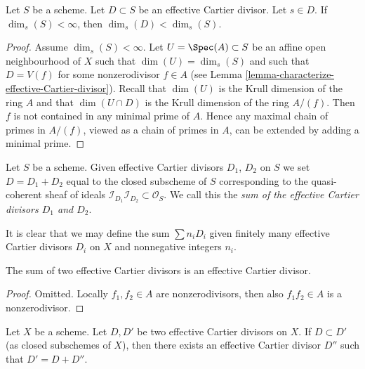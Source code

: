 \begin{lemma}
\label{lemma-effective-Cartier-makes-dimension-drop}
Let $S$ be a scheme.
Let $D \subset S$ be an effective Cartier divisor.
Let $s \in D$.
If $\dim_s(S) < \infty$, then $\dim_s(D) < \dim_s(S)$.
\end{lemma}

\begin{proof}
Assume $\dim_s(S) < \infty$.
Let $U = \Spec(A) \subset S$ be an affine open neighbourhood
of $X$ such that $\dim(U) = \dim_s(S)$ and such that $D = V(f)$
for some nonzerodivisor $f \in A$ (see
Lemma \ref{lemma-characterize-effective-Cartier-divisor}).
Recall that $\dim(U)$ is the Krull dimension of the ring $A$
and that $\dim(U \cap D)$ is the Krull dimension of the ring $A/(f)$.
Then $f$ is not contained in any minimal prime of $A$.
Hence any maximal chain of primes in $A/(f)$, viewed as a chain
of primes in $A$, can be extended by adding a minimal prime.
\end{proof}

\begin{definition}
\label{definition-sum-effective-Cartier-divisors}
Let $S$ be a scheme. Given effective Cartier divisors
$D_1$, $D_2$ on $S$ we set $D = D_1 + D_2$ equal to the
closed subscheme of $S$ corresponding to the quasi-coherent
sheaf of ideals
$\mathcal{I}_{D_1}\mathcal{I}_{D_2} \subset \mathcal{O}_S$.
We call this the {\it sum of the effective Cartier divisors
$D_1$ and $D_2$}.
\end{definition}

\noindent
It is clear that we may define the sum $\sum n_iD_i$ given
finitely many effective Cartier divisors $D_i$ on $X$
and nonnegative integers $n_i$.

\begin{lemma}
\label{lemma-sum-effective-Cartier-divisors}
The sum of two effective Cartier divisors is an effective
Cartier divisor.
\end{lemma}

\begin{proof}
Omitted. Locally $f_1, f_2 \in A$ are nonzerodivisors, then also
$f_1f_2 \in A$ is a nonzerodivisor.
\end{proof}

\begin{lemma}
\label{lemma-difference-effective-Cartier-divisors}
Let $X$ be a scheme.
Let $D, D'$ be two effective Cartier divisors on $X$.
If $D \subset D'$ (as closed subschemes of $X$), then
there exists an effective Cartier divisor $D''$ such
that $D' = D + D''$.
\end{lemma}

